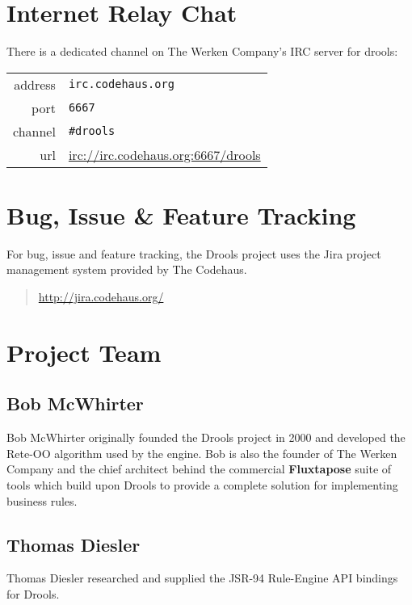 \section{Internet Relay Chat}

There is a dedicated channel on The Werken Company's IRC server for
drools:\\

\begin{tabular}{rl}
address & \verb|irc.codehaus.org| \\
port    & \verb|6667| \\
channel & \verb|#drools|\\
url     & \url{irc://irc.codehaus.org:6667/drools}\\
\end{tabular}

\bigskip

\section{Bug, Issue \& Feature Tracking}

For bug, issue and feature tracking, the Drools project uses the
Jira project management system provided by The Codehaus.

\begin{quote}
    \url{http://jira.codehaus.org/}
\end{quote}

\clearpage

\section{Project Team}

\subsection{Bob McWhirter}

Bob McWhirter originally founded the Drools project in 2000 and
developed the Rete-OO algorithm used by the engine.  Bob is also
the founder of The Werken Company and the chief architect behind
the commercial \textbf{Fluxtapose} suite of tools which build
upon Drools to provide a complete solution for implementing
business rules.

\subsection{Thomas Diesler}

Thomas Diesler researched and supplied the JSR-94 Rule-Engine API
bindings for Drools.

